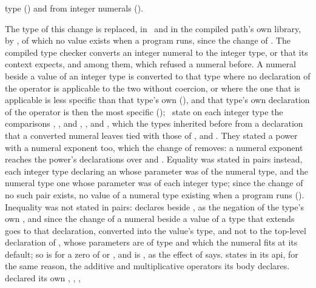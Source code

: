 \begin{description}
type () and  from integer numerals
().
\item[Effect] The type  of this change is replaced, in
\library\ and in the compiled path's own library, by
, of which no value exists
when a program runs, since the change of .
The compiled type checker converts an integer numeral to the
integer type,  or  that its context expects,
 and  among them, which refused a numeral
before.
A numeral beside a value of an integer type is converted to that type where no
declaration of the operator is applicable to the two without coercion, or where
the one that is applicable is less specific than that type's own
(), and that
type's own declaration of the operator is then the most specific
(); \library\ state on each integer type the
comparisons \EXP{<}, \EXP{\leq}, \EXP{>} and \EXP{\geq}, ,
 and , which the types inherited before from a
declaration that a converted numeral leaves tied with those of
,  and .
They stated a power with a numeral exponent too, which the change of
 removes: a numeral exponent reaches the power's
declarations over  and .
Equality was stated in pairs instead, each integer type declaring an \EXP{=}
whose parameter was of the numeral type, and the numeral type one whose
parameter was of each integer type; since the change of
 no such pair exists, no value of a numeral type
existing when a program runs ().
Inequality was not stated in pairs:  declares \EXP{\neq} beside
\EXP{=}, as the negation of the type's own \EXP{=}, and since the change of
 a numeral beside a value of a type that extends
 goes to that declaration, converted into the value's type, and
not to the top-level declaration of \EXP{\neq}, whose parameters are of type
 and which the numeral fits at its default; so  is
 for a zero  of  or ,
and  is , as the effect of
 says.
 states in its api, for the same reason, the additive and
multiplicative operators its body declares.
 declared its own , , ,

\end{description}
